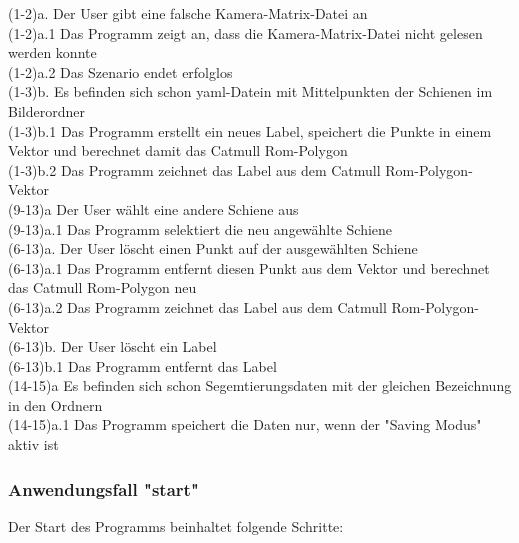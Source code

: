 \documentclass[11pt]{scrartcl}
\begin{document}
\noindent
(1-2)a. Der User gibt eine falsche Kamera-Matrix-Datei an
\\ 
\noindent
(1-2)a.1 Das Programm zeigt an, dass die Kamera-Matrix-Datei nicht gelesen werden konnte
\\ 
\noindent
(1-2)a.2 Das Szenario endet erfolglos
\\ 

\noindent
(1-3)b. Es befinden sich schon yaml-Datein mit Mittelpunkten der Schienen im Bilderordner
\\ 
\noindent
(1-3)b.1  Das Programm erstellt ein neues Label, speichert die Punkte in einem Vektor und berechnet damit das Catmull Rom-Polygon
\\ 
\noindent
(1-3)b.2 Das Programm zeichnet das Label aus dem Catmull Rom-Polygon-Vektor
\\

\noindent
(9-13)a Der User wählt eine andere Schiene aus
\\ 
\noindent
(9-13)a.1 Das Programm selektiert die neu angewählte Schiene
\\

\noindent
(6-13)a. Der User löscht einen Punkt auf der ausgewählten Schiene
\\ 
\noindent
(6-13)a.1 Das Programm entfernt diesen Punkt aus dem Vektor und berechnet das Catmull Rom-Polygon neu
\\ 
\noindent
(6-13)a.2 Das Programm zeichnet das Label aus dem Catmull Rom-Polygon-Vektor
\\ 

\noindent
(6-13)b. Der User löscht ein Label
\\ 
\noindent
(6-13)b.1 Das Programm entfernt das Label 
\\ 

\noindent
(14-15)a Es befinden sich schon Segemtierungsdaten mit der gleichen Bezeichnung in den Ordnern
\\ 
\noindent
(14-15)a.1 Das Programm speichert die Daten nur, wenn der "Saving Modus" aktiv ist

\subsubsection{Anwendungsfall "start"}
\label{sec:Anwendungsfall "start"}

Der Start des Programms beinhaltet folgende Schritte:
\\
\end{document}
